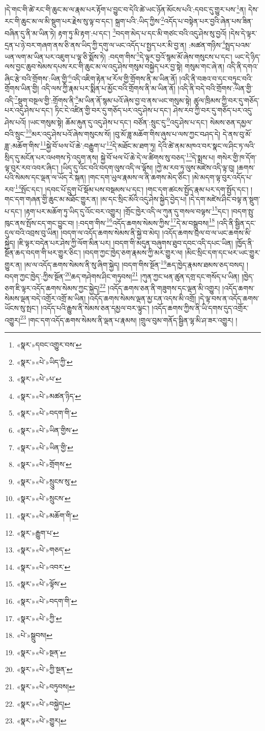 །དེ་གང་གི་ཚེ་རང་གི་ཆུང་མ་ལ་རྣམ་པར་རྟོག་པ་བྱུང་བ་དེའི་ཚེ་ཡང་ཉོན་མོངས་པའི་:དབང་དུ་གྱུར་པས་\footnote{«སྣར་»དབང་འགྱུར་བས་}ན། དེས་རང་གི་ཆུང་མ་ལ་མི་སྡུག་པར་རྗེས་སུ་ལྟ་བ་དང་། སྐྲག་པའི་:ཡིད་ཀྱིས་\footnote{«སྣར་»«པེ་»ཡིད་ཀྱི་}འདོད་པ་བསྟེན་པར་བྱའི་ཞེན་པས་ཟིན་བཞིན་དུ་ནི་མ་ཡིན་ཏེ། རྟག་ཏུ་མི་རྟག་:པ་དང་། \footnote{«སྣར་»«པེ་»པ་}བདག་མེད་པ་དང་མི་གཙང་བའི་འདུ་ཤེས་སུ་བྱའོ། །དེས་དེ་ལྟར་དྲན་པ་ཉེ་བར་གཞག་ནས་ཅི་ནས་ཡིད་ཀྱི་དགུ་ལ་ཡང་འདོད་པ་སྤྱད་པར་མི་བྱ་ན། :མཚན་གཉིས་\footnote{«སྣར་»«པེ་»མཚན་ཉིད་}སྤྲད་པའམ་ཡན་ལག་མ་ཡིན་པར་འཇུག་པ་ལྟ་ཅི་སྨོས་ཏེ། :བདག་གིས་\footnote{«སྣར་»«པེ་»བདག་གི་}དེ་ལྟར་བྱའོ་སྙམ་མོ་ཞེས་གསུངས་པ་དང་། ཡང་དེ་ཉིད་ལས་བྱང་ཆུབ་སེམས་དཔས་རང་གི་ཆུང་མ་ལ་འདུ་ཤེས་གསུམ་བསྐྱེད་པར་བྱ་སྟེ། གསུམ་གང་ཞེ་ན། འདི་ནི་དགའ་ཞིང་རྩེ་བའི་གྲོགས་:ཡིན་གྱི་\footnote{«སྣར་»«པེ་»ཡིན་གྱིས་}འདི་འཇིག་རྟེན་ཕ་རོལ་གྱི་གྲོགས་ནི་མ་ཡིན་ནོ། །འདི་ནི་བཟའ་བ་དང་བཏུང་བའི་གྲོགས་ཡིན་གྱི། འདི་ལས་ཀྱི་རྣམ་པར་སྨིན་པ་མྱོང་བའི་གྲོགས་ནི་མ་ཡིན་ནོ། །འདི་ནི་བདེ་བའི་གྲོགས་:ཡིན་གྱི་འདི་\footnote{«སྣར་»«པེ་»ཡིན་གྱི་}སྡུག་བསྔལ་གྱི་:གྲོགས་ནི་\footnote{«སྣར་»«པེ་»གྲོགས་}མ་ཡིན་ནོ་སྙམ་པའོ་ཞེས་བྱ་བ་ནས་ཡང་གསུམ་སྟེ། ཚུལ་ཁྲིམས་ཀྱི་བར་དུ་གཅོད་པར་འདུ་ཤེས་པ་དང་། ཏིང་ངེ་འཛིན་གྱི་བར་དུ་གཅོད་པར་འདུ་ཤེས་པ་དང་། ཤེས་རབ་ཀྱི་བར་དུ་གཅོད་པར་འདུ་ཤེས་པའོ། །ཡང་གསུམ་སྟེ། ཆོམ་རྐུན་དུ་འདུ་ཤེས་པ་དང་། བཙོན་:སྲུང་དུ་\footnote{«སྣར་»«པེ་»སྲུུངས་སུ་}འདུ་ཤེས་པ་དང་། སེམས་ཅན་དམྱལ་བའི་སྲུང་\footnote{«སྣར་»«པེ་»སྲུངས་}མར་འདུ་ཤེས་པའོ་ཞེས་གསུངས་སོ། །བུ་མོ་ཟླ་མཆོག་གིས་ཞུས་པ་ལས་ཀྱང་བཤད་དེ། དེ་ནས་བུ་མོ་ཟླ་:མཆོག་གིས་\footnote{«སྣར་»«པེ་»མཆོག་གི་}སྐྱེ་བོ་ཕལ་པོ་ཆེ་:བརྒྱུག་པ་\footnote{«སྣར་»རྒྱུག་པ་}དེ་མཐོང་མ་ཐག་ཏུ། དེའི་ཚེ་ནམ་མཁའ་བར་སྣང་ལ་ཤིང་ཏ་ལའི་སྲིད་དུ་མངོན་པར་འཕགས་ཏེ་འདུག་ནས། སྐྱེ་བོ་ཕལ་པོ་ཆེ་དེ་ལ་ཚིགས་སུ་བཅད་\footnote{«སྣར་»«པེ་»གཅད་}དེ་སྨྲས་པ། གསེར་གྱི་ཁ་དོག་ལྟ་བུར་རབ་འབར་ཞིང་། །ཡིད་དུ་འོང་བའི་བདག་ལུས་འདི་ལ་ལྟོས། །ཀྱེ་མ་རབ་ཏུ་ལུས་མཛེས་འདི་ལྟ་བུ། །ཆགས་པའི་སེམས་དང་ལྡན་ལ་ཡོད་རེ་སྐན། །གང་དག་ཡུལ་རྣམས་ལ་ནི་ཆགས་མེད་ཅིང་། །མེ་མདག་ལྟ་བུར་འདོད་པ་རབ་\footnote{«སྣར་»«པེ་»འབར་}སྤོང་དང་། །དབང་པོ་དྲུག་པོ་སྡོམ་པས་བསྡམས་པ་དང་། །གང་དག་ཚངས་སྤྱོད་རྣམ་པར་དག་སྤྱོད་དང་། །གང་དག་གཞན་གྱི་ཆུང་མ་མཐོང་གྱུར་ན། །མ་དང་སྲིང་མོའི་འདུ་ཤེས་སྐྱེད་བྱེད་པ། །དེ་དག་མཛེས་ཤིང་བལྟ་ན་སྡུག་པ་དང་། །རྟག་པར་མཆོག་ཏུ་ཡིད་དུ་འོང་བར་འགྱུར། །གྲོང་ཁྱེར་འདི་ལ་ཀུན་དུ་གསལ་བལྟས་\footnote{«སྣར་»«པེ་»ལྟོས་}དང་། །བདག་སྤུ་ཁུང་ནས་སྤོས་ངད་གང་བྱུང་བ། །:བདག་གིས་\footnote{«སྣར་»«པེ་»བདག་གི་}འདོད་ཆགས་སེམས་ཀྱིས་\footnote{«སྣར་»«པེ་»ཀྱི་}དེ་མ་བསྒྲུབས།\footnote{«པེ་»སྒྲུབས།} །འདི་ནི་སྦྱིན་དང་དུལ་བའི་འབྲས་བུ་ཡིན། །བདག་ལ་འདོད་ཆགས་སེམས་ནི་སྐྱེ་བ་མེད། །འདོད་ཆགས་བྲལ་བ་ལ་ཡང་ཆགས་མི་སྐྱེད། །ཇི་ལྟར་བདེན་པར་ཤེས་ཀྱི་ལོག་མིན་པར། །བདག་གི་མདུན་བཞུགས་ཐུབ་དབང་འདི་དཔང་ཡིན། །ཁྱོད་ནི་སྔོན་ཆད་བདག་གི་ཕར་གྱུར་ཅིང་། །བདག་ཀྱང་ཁྱེད་ཅག་རྣམས་ཀྱི་མར་གྱུར་ལ། །མིང་སྲིང་དག་དང་ཕར་ཡང་གྱུར་གྱུར་ན། །མ་ལ་འདོད་ཆགས་སེམས་ནི་སུ་ཞིག་སྐྱེད། །བདག་གིས་སྔོན་\footnote{«སྣར་»«པེ་»སྔན་}ཆད་ཁྱེད་རྣམས་ཐམས་ཅད་བསད། །བདག་ཀྱང་ཁྱེད་:ཀྱིས་སྔོན་\footnote{«སྣར་»«པེ་»ཀྱི་སྔན་}ཆད་གཤེགས་ཤིང་གཏུབས།\footnote{«སྣར་»«པེ་»བཏུབས།} །ཀུན་ཀྱང་ཕན་ཚུན་དགྲ་དང་གསོད་པ་ཡིན། །ཁྱེད་ཅག་ཇི་ལྟར་འདོད་ཆགས་སེམས་ཀྱང་སྐྱེད།\footnote{«སྣར་»«པེ་»བསྐྱེད།} །འདོད་ཆགས་ཅན་ནི་གཟུགས་དང་ལྡན་མི་འགྱུར། །འདོད་ཆགས་སེམས་ལྡན་བདེ་འགྲོར་འགྲོ་མ་ཡིན། །འདོད་ཆགས་སེམས་ལྡན་མྱ་ངན་འདས་མི་འགྲོ། །དེ་ལྟ་བས་ན་འདོད་ཆགས་ཡོངས་སུ་སྤང་། །འདོད་པའི་རྒྱུས་ནི་སེམས་ཅན་དམྱལ་བར་ལྟུང་། །འདོད་ཆགས་ཀྱིས་ནི་ཡི་དགས་དུད་འགྲོར་འགྱུར།\footnote{«སྣར་»«པེ་»གྱུར།} །གང་དག་འདོད་ཆགས་སེམས་ནི་ལྡན་པ་རྣམས། །གྲུལ་བུམ་གནོད་སྦྱིན་ལྷ་མི་ཤ་ཟར་འགྱུར། །
